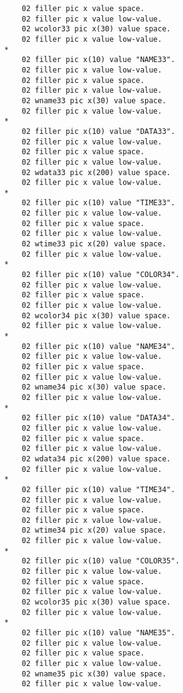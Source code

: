 {{{\begin{verbatim}
          02 filler pic x value space.
          02 filler pic x value low-value.
          02 wcolor33 pic x(30) value space.
          02 filler pic x value low-value.
      *    
          02 filler pic x(10) value "NAME33".
          02 filler pic x value low-value.
          02 filler pic x value space.
          02 filler pic x value low-value.
          02 wname33 pic x(30) value space.
          02 filler pic x value low-value.
      *    
          02 filler pic x(10) value "DATA33".
          02 filler pic x value low-value.
          02 filler pic x value space.
          02 filler pic x value low-value.
          02 wdata33 pic x(200) value space.
          02 filler pic x value low-value.
      *    
          02 filler pic x(10) value "TIME33".
          02 filler pic x value low-value.
          02 filler pic x value space.
          02 filler pic x value low-value.
          02 wtime33 pic x(20) value space.
          02 filler pic x value low-value.
      *    
          02 filler pic x(10) value "COLOR34".
          02 filler pic x value low-value.
          02 filler pic x value space.
          02 filler pic x value low-value.
          02 wcolor34 pic x(30) value space.
          02 filler pic x value low-value.
      *    
          02 filler pic x(10) value "NAME34".
          02 filler pic x value low-value.
          02 filler pic x value space.
          02 filler pic x value low-value.
          02 wname34 pic x(30) value space.
          02 filler pic x value low-value.
      *    
          02 filler pic x(10) value "DATA34".
          02 filler pic x value low-value.
          02 filler pic x value space.
          02 filler pic x value low-value.
          02 wdata34 pic x(200) value space.
          02 filler pic x value low-value.
      *    
          02 filler pic x(10) value "TIME34".
          02 filler pic x value low-value.
          02 filler pic x value space.
          02 filler pic x value low-value.
          02 wtime34 pic x(20) value space.
          02 filler pic x value low-value.
      *    
          02 filler pic x(10) value "COLOR35".
          02 filler pic x value low-value.
          02 filler pic x value space.
          02 filler pic x value low-value.
          02 wcolor35 pic x(30) value space.
          02 filler pic x value low-value.
      *    
          02 filler pic x(10) value "NAME35".
          02 filler pic x value low-value.
          02 filler pic x value space.
          02 filler pic x value low-value.
          02 wname35 pic x(30) value space.
          02 filler pic x value low-value.

\end{verbatim}}}}
